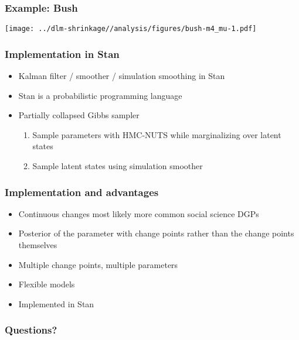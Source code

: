 \documentclass[]{beamer}\usepackage[]{graphicx}\usepackage[]{color}
\begin{document}
\begin{frame}
  \frametitle{Example: Bush}
    \texttt{[image: ../dlm-shrinkage//analysis/figures/bush-m4\_mu-1.pdf]}
\end{frame}

\begin{frame}
  \frametitle{Implementation in Stan}

  \begin{itemize}
  \item Kalman filter / smoother / simulation smoothing in Stan
  \item Stan is a probabilistic programming language
  \item Partially collapsed Gibbs sampler
    \begin{enumerate}
    \item Sample parameters with HMC-NUTS while marginalizing over latent states
    \item Sample latent states using simulation smoother
    \end{enumerate}
  \end{itemize}
  
\end{frame}

\begin{frame}
  \frametitle{Implementation and advantages}

  \begin{itemize}
  \item Continuous changes most likely more common social science DGPs
  \item Posterior of the parameter with change points rather than the change points themselves
  \item Multiple change points, multiple parameters
  \item Flexible models
  \item Implemented in Stan
  \end{itemize}
  
\end{frame}

\begin{frame}
  \frametitle{Questions?}
\end{frame}
\end{document}
